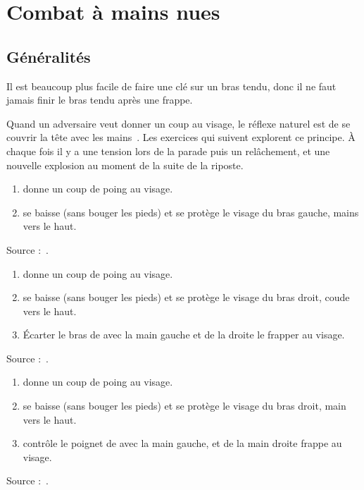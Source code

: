 \chapter{Combat à mains nues}


\section{Généralités}

Il est beaucoup plus facile de faire une clé sur un bras tendu, donc il ne faut jamais finir le bras tendu après une frappe.


Quand un adversaire veut donner un coup au visage, le réflexe naturel est de se couvrir la tête avec les mains~\cite{enzi:dijon:messer_inner:2015}.
Les exercices qui suivent explorent ce principe.
À chaque fois il y a une tension lors de la parade puis un relâchement, et une nouvelle explosion au moment de la suite de la riposte.


\begin{exercice}
\label{mains-nues:ex:enzi-1}

\begin{enumerate}
	\item \A donne un coup de poing au visage.
	\item \D se baisse (sans bouger les pieds) et se protège le visage du bras gauche, mains vers le haut.
\end{enumerate}

Source :~\cite{enzi:dijon:messer_inner:2015}.

\end{exercice}


\begin{exercice}
\label{mains-nues:ex:enzi-2}

\begin{enumerate}
	\item \A donne un coup de poing au visage.
	\item \D se baisse (sans bouger les pieds) et se protège le visage du bras droit, coude vers le haut.
	\item Écarter le bras de \A avec la main gauche et de la droite le frapper au visage.
\end{enumerate}

Source :~\cite{enzi:dijon:messer_inner:2015}.

\end{exercice}


\begin{exercice}
\label{mains-nues:ex:enzi-3}

\begin{enumerate}
	\item \A donne un coup de poing au visage.
	\item \D se baisse (sans bouger les pieds) et se protège le visage du bras droit, main vers le haut.
	\item \D contrôle le poignet de \A avec la main gauche, et de la main droite frappe au visage.
\end{enumerate}

Source :~\cite{enzi:dijon:messer_inner:2015}.

\end{exercice}


